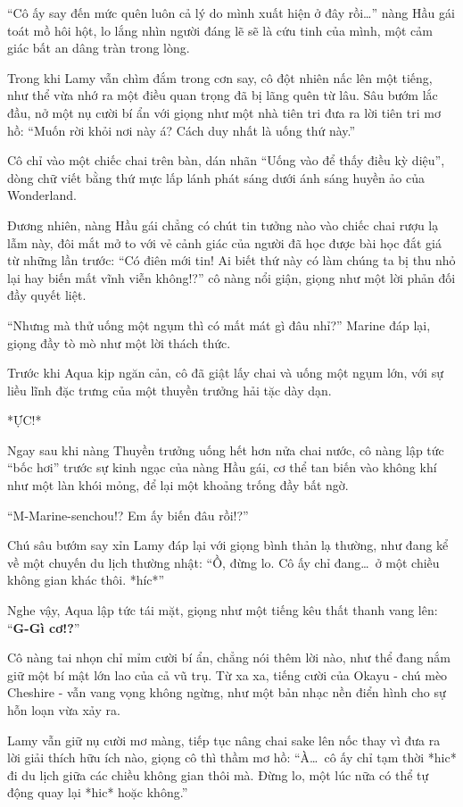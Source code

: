 \documentclass[../main.tex]{subfiles}
\begin{document}
``Cô ấy say đến mức quên luôn cả lý do mình xuất hiện ở đây rồi\dots'' nàng Hầu gái toát mồ hôi hột, lo lắng nhìn người đáng lẽ sẽ là cứu tinh của mình, một cảm giác bất an dâng tràn trong lòng.

Trong khi Lamy vẫn chìm đắm trong cơn say, cô đột nhiên nấc lên một tiếng, như thể vừa nhớ ra một điều quan trọng đã bị lãng quên từ lâu. Sâu bướm lắc đầu, nở một nụ cười bí ẩn với giọng như một nhà tiên tri đưa ra lời tiên tri mơ hồ: ``Muốn rời khỏi nơi này á? Cách duy nhất là uống thứ này.''

Cô chỉ vào một chiếc chai trên bàn, dán nhãn ``Uống vào để thấy điều kỳ diệu'', dòng chữ viết bằng thứ mực lấp lánh phát sáng dưới ánh sáng huyền ảo của Wonderland.

Đương nhiên, nàng Hầu gái chẳng có chút tin tưởng nào vào chiếc chai rượu lạ lẫm này, đôi mắt mở to với vẻ cảnh giác của người đã học được bài học đắt giá từ những lần trước: ``Có điên mới tin! Ai biết thứ này có làm chúng ta bị thu nhỏ lại hay biến mất vĩnh viễn không!?'' cô nàng nổi giận, giọng như một lời phản đối đầy quyết liệt.

``Nhưng mà thử uống một ngụm thì có mất mát gì đâu nhỉ?'' Marine đáp lại, giọng đầy tò mò như một lời thách thức.

Trước khi Aqua kịp ngăn cản, cô đã giật lấy chai và uống một ngụm lớn, với sự liều lĩnh đặc trưng của một thuyền trưởng hải tặc dày dạn.

*ỰC!*

Ngay sau khi nàng Thuyền trưởng uống hết hơn nửa chai nước, cô nàng lập tức ``bốc hơi'' trước sự kinh ngạc của nàng Hầu gái, cơ thể tan biến vào không khí như một làn khói mỏng, để lại một khoảng trống đầy bất ngờ.

``M-Marine-senchou!? Em ấy biến đâu rồi!?''

Chú sâu bướm say xỉn Lamy đáp lại với giọng bình thản lạ thường, như đang kể về một chuyến du lịch thường nhật: ``Ồ, đừng lo. Cô ấy chỉ đang\dots\ ở một chiều không gian khác thôi. *híc*''

Nghe vậy, Aqua lập tức tái mặt, giọng như một tiếng kêu thất thanh vang lên: ``\textbf{G-Gì cơ!?}''

Cô nàng tai nhọn chỉ mỉm cười bí ẩn, chẳng nói thêm lời nào, như thể đang nắm giữ một bí mật lớn lao của cả vũ trụ. Từ xa xa, tiếng cười của Okayu - chú mèo Cheshire - vẫn vang vọng không ngừng, như một bản nhạc nền điển hình cho sự hỗn loạn vừa xảy ra.

Lamy vẫn giữ nụ cười mơ màng, tiếp tục nâng chai sake lên nốc thay vì đưa ra lời giải thích hữu ích nào, giọng cô thì thầm mơ hồ: ``À\dots\ cô ấy chỉ tạm thời *hic* đi du lịch giữa các chiều không gian thôi mà. Đừng lo, một lúc nữa có thể tự động quay lại *hic* hoặc không.''
\end{document}
